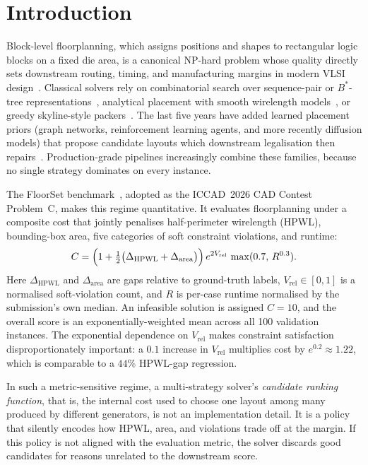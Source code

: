 \documentclass[nolineno]{ieeeaccess}
\begin{document}
\section{Introduction}
\label{sec:intro}

Block-level floorplanning, which assigns positions and shapes to
rectangular logic blocks on a fixed die area, is a canonical NP-hard
problem
whose quality directly sets downstream routing, timing, and
manufacturing margins in modern VLSI design~\cite{wang2009electronic,markov2012progress}.
Classical solvers rely on combinatorial search over sequence-pair or
$B^{*}$-tree representations~\cite{murata1996sequence,chang2000btree}, analytical
placement with smooth wirelength models~\cite{lu2015eplace,lin2019dreamplace},
or greedy skyline-style packers~\cite{hopper2001two}. The last five years
have added learned placement priors (graph networks, reinforcement
learning agents, and more recently diffusion models) that propose
candidate layouts which downstream legalisation then
repairs~\cite{mirhoseini2021graph,cheng2023assessment,lai2022maskplace,lai2023chipformer,peebles2022dit}.
Production-grade pipelines increasingly combine these families, because
no single strategy dominates on every instance.

The FloorSet benchmark~\cite{floorset}, adopted as the ICCAD~2026 CAD
Contest Problem~C, makes this regime
quantitative. It evaluates floorplanning under a composite cost that
jointly penalises half-perimeter wirelength (HPWL), bounding-box area,
five categories of soft constraint violations, and runtime:
\begin{equation}
C = \Bigl(1 + \tfrac{1}{2}\bigl(\Delta_{\text{HPWL}} + \Delta_{\text{area}}\bigr)\Bigr)
    \,e^{2V_{\text{rel}}}\,\max(0.7,\,R^{0.3}).
\label{eq:contest-cost}
\end{equation}
Here $\Delta_{\text{HPWL}}$ and $\Delta_{\text{area}}$ are gaps relative to
ground-truth labels, $V_{\text{rel}}\in[0,1]$ is a normalised soft-violation
count, and $R$ is per-case runtime normalised by the submission's own
median. An infeasible solution is assigned $C=10$, and the overall
score is an exponentially-weighted mean across all 100 validation
instances. The exponential dependence on $V_{\text{rel}}$ makes constraint
satisfaction disproportionately important: a $0.1$ increase in
$V_{\text{rel}}$ multiplies cost by $e^{0.2}\approx 1.22$, which is comparable
to a $44\%$ HPWL-gap regression.

In such a metric-sensitive regime, a multi-strategy solver's
\emph{candidate ranking function}, that is, the internal cost used to
choose one layout among many produced by different generators, is not an
implementation detail. It is a policy that silently encodes how HPWL,
area, and violations trade off at the margin. If this policy is not
aligned with the evaluation metric, the solver discards good candidates
for reasons unrelated to the downstream score.
\end{document}
